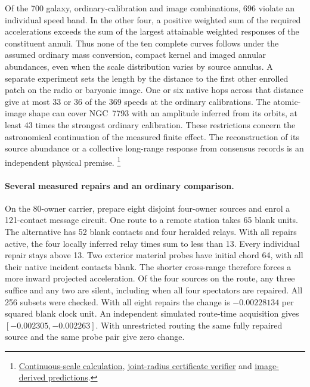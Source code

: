 \documentclass[11pt]{article}
\begin{document}
Of the 700 galaxy, ordinary-calibration and image combinations, 696
violate an individual speed band. In the other four, a positive
weighted sum of the required accelerations exceeds the sum of the
largest attainable weighted responses of the constituent annuli.
Thus none of the ten complete curves follows under the assumed
ordinary mass conversion, compact kernel and imaged annular abundances,
even when the scale distribution varies by source annulus. A separate
experiment sets the length by the distance to the first other enrolled
patch on the radio or baryonic image. One or six native hops across that
distance give at most 33 or 36 of the 369 speeds at the ordinary
calibrations. The atomic-image shape can cover NGC~7793 with an amplitude
inferred from its orbits, at least 43 times the strongest ordinary
calibration. These restrictions concern the astronomical continuation
of the measured finite effect. The reconstruction of its source
abundance or a collective long-range response from consensus records
is an independent physical premise.%
\footnote{\href{https://github.com/FloatingPragma/observer-patch-holography/blob/main/code/cosmology/paid_trail_bao/tidal_scales.py}{Continuous-scale calculation},
\href{https://github.com/FloatingPragma/observer-patch-holography/blob/main/code/cosmology/paid_trail_bao/tidal_mixture.py}{joint-radius certificate verifier}
and \href{https://github.com/FloatingPragma/observer-patch-holography/blob/main/code/cosmology/paid_trail_bao/tidal_neighbors.py}{image-derived predictions}.}

\paragraph{Several measured repairs and an ordinary comparison.}
On the 80-owner carrier, prepare eight disjoint four-owner sources and
enrol a 121-contact message circuit. One route to a remote station
takes 65 blank units. The alternative has 52 blank contacts and four
heralded relays. With all repairs active, the four locally inferred
relay times sum to less than 13. Every individual repair stays above
13. Two exterior material probes have initial chord 64, with all
their native incident contacts blank. The shorter cross-range therefore
forces a more inward projected acceleration. Of the four sources on
the route, any three suffice and any two are silent, including when
all four spectators are repaired. All 256 subsets were checked.
With all eight repairs the change is \(-0.00228134\) per squared
blank clock unit. An independent simulated route-time acquisition
gives \([-0.002305,-0.002263]\). With unrestricted routing the same
fully repaired source and the same probe pair give zero change.
\end{document}
